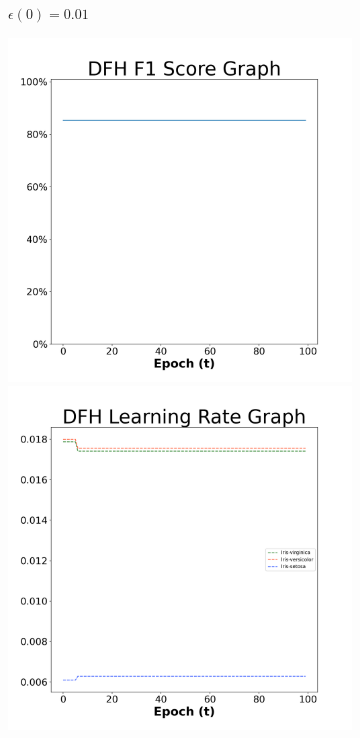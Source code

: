 \begin{figure}[H]
\begin{subfigure}{0.3\textwidth}
  \caption{$\epsilon(0)=0.01$}
\end{subfigure}\hfil %
\begin{subfigure}{0.3\textwidth}
  \includegraphics[width=\linewidth]{images/exper2/iris/DFH_0.03_f1.png}
  \includegraphics[width=\linewidth]{images/exper2/iris/DFH_0.03_lr.png}

\end{subfigure}
\end{figure}
